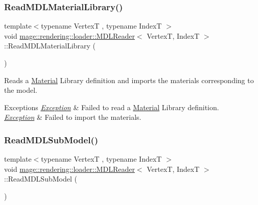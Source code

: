 \subsubsection{\texorpdfstring{Read\+M\+D\+L\+Material\+Library()}{ReadMDLMaterialLibrary()}}
{\footnotesize\ttfamily template$<$typename VertexT , typename IndexT $>$ \\
void \mbox{\hyperlink{classmage_1_1rendering_1_1loader_1_1_m_d_l_reader}{mage\+::rendering\+::loader\+::\+M\+D\+L\+Reader}}$<$ VertexT, IndexT $>$\+::Read\+M\+D\+L\+Material\+Library (\begin{DoxyParamCaption}{ }\end{DoxyParamCaption})\hspace{0.3cm}{\ttfamily [private]}}

Reads a \mbox{\hyperlink{classmage_1_1rendering_1_1_material}{Material}} Library definition and imports the materials corresponding to the model.


\begin{DoxyExceptions}{Exceptions}
{\em \mbox{\hyperlink{classmage_1_1_exception}{Exception}}} & Failed to read a \mbox{\hyperlink{classmage_1_1rendering_1_1_material}{Material}} Library definition. \\
\hline
{\em \mbox{\hyperlink{classmage_1_1_exception}{Exception}}} & Failed to import the materials. \\
\hline
\end{DoxyExceptions}
\mbox{\label{classmage_1_1rendering_1_1loader_1_1_m_d_l_reader_afe15d41185ac5f4de6607561d7068d8c}} 
\subsubsection{\texorpdfstring{Read\+M\+D\+L\+Sub\+Model()}{ReadMDLSubModel()}}
{\footnotesize\ttfamily template$<$typename VertexT , typename IndexT $>$ \\
void \mbox{\hyperlink{classmage_1_1rendering_1_1loader_1_1_m_d_l_reader}{mage\+::rendering\+::loader\+::\+M\+D\+L\+Reader}}$<$ VertexT, IndexT $>$\+::Read\+M\+D\+L\+Sub\+Model (\begin{DoxyParamCaption}{ }\end{DoxyParamCaption})\hspace{0.3cm}{\ttfamily [private]}}

